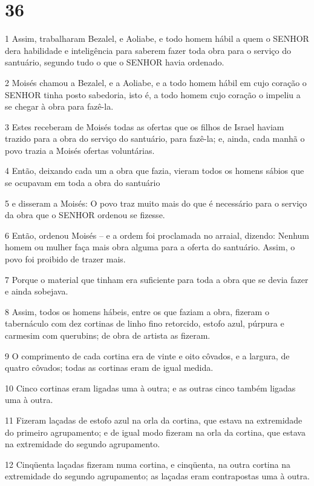 \chapter{36}

\par 1 Assim, trabalharam Bezalel, e Aoliabe, e todo homem hábil a quem o SENHOR dera habilidade e inteligência para saberem fazer toda obra para o serviço do santuário, segundo tudo o que o SENHOR havia ordenado.
\par 2 Moisés chamou a Bezalel, e a Aoliabe, e a todo homem hábil em cujo coração o SENHOR tinha posto sabedoria, isto é, a todo homem cujo coração o impeliu a se chegar à obra para fazê-la.
\par 3 Estes receberam de Moisés todas as ofertas que os filhos de Israel haviam trazido para a obra do serviço do santuário, para fazê-la; e, ainda, cada manhã o povo trazia a Moisés ofertas voluntárias.
\par 4 Então, deixando cada um a obra que fazia, vieram todos os homens sábios que se ocupavam em toda a obra do santuário
\par 5 e disseram a Moisés: O povo traz muito mais do que é necessário para o serviço da obra que o SENHOR ordenou se fizesse.
\par 6 Então, ordenou Moisés -- e a ordem foi proclamada no arraial, dizendo: Nenhum homem ou mulher faça mais obra alguma para a oferta do santuário. Assim, o povo foi proibido de trazer mais.
\par 7 Porque o material que tinham era suficiente para toda a obra que se devia fazer e ainda sobejava.
\par 8 Assim, todos os homens hábeis, entre os que faziam a obra, fizeram o tabernáculo com dez cortinas de linho fino retorcido, estofo azul, púrpura e carmesim com querubins; de obra de artista as fizeram.
\par 9 O comprimento de cada cortina era de vinte e oito côvados, e a largura, de quatro côvados; todas as cortinas eram de igual medida.
\par 10 Cinco cortinas eram ligadas uma à outra; e as outras cinco também ligadas uma à outra.
\par 11 Fizeram laçadas de estofo azul na orla da cortina, que estava na extremidade do primeiro agrupamento; e de igual modo fizeram na orla da cortina, que estava na extremidade do segundo agrupamento.
\par 12 Cinqüenta laçadas fizeram numa cortina, e cinqüenta, na outra cortina na extremidade do segundo agrupamento; as laçadas eram contrapostas uma à outra.

